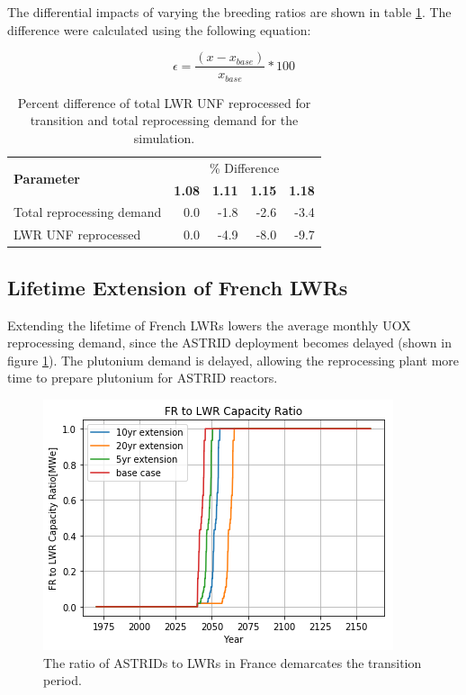 The differential impacts of varying the breeding ratios are
shown in table \ref{tab:br_diff}. The difference were calculated
using the following equation:

\[ \epsilon = \frac{(x - x_{base})}{x_{base}} * 100 \]

\begin{table}[h]
	\centering
	\caption{Percent difference of total \gls{LWR} \gls{UNF} reprocessed
		for transition and total reprocessing demand for the simulation.}
	\begin{tabular}{lrrrr}
		\hline
		\multirow{2}{*}{\textbf{Parameter}} & \multicolumn{4}{c}{\% Difference} \\
		 & \textbf{1.08}& \textbf{1.11} & \textbf{1.15} & \textbf{1.18} \\
		\hline
		Total reprocessing demand & 0.0 & -1.8 & -2.6 & -3.4 \\ 
		\gls{LWR} \gls{UNF} reprocessed & 0.0  & -4.9 & -8.0 & -9.7 \\
		\hline
	\end{tabular}
	\label{tab:br_diff}
\end{table}


\subsection{Lifetime Extension of French \glspl{LWR}}\label{sec:life}
Extending the lifetime of French \glspl{LWR} lowers the average
monthly \gls{UOX} reprocessing demand, since the \gls{ASTRID} deployment becomes 
delayed (shown in figure \ref{fig:pow_diff}). The plutonium demand is delayed,
 allowing the reprocessing plant more time to prepare plutonium for \gls{ASTRID} reactors.

\begin{figure}[htbp!]
    \begin{center}
        \includegraphics[scale=0.7]{./images/sensitivity/pow_ratio.png}
    \end{center}
    \caption{The ratio of \glspl{ASTRID} to \glspl{LWR} in France demarcates 
    the transition period.}
    \label{fig:pow_diff}
\end{figure}

